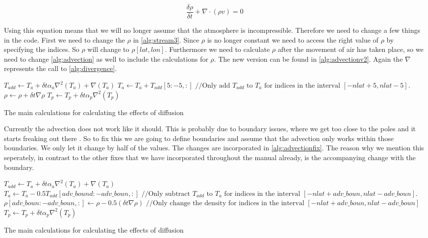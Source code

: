 \begin{equation}
    \frac{\delta \rho}{\delta t} + \nabla \cdot (\rho v) = 0
    \label{eq:mass continuity}
\end{equation}

Using this equation means that we will no longer assume that the atmosphere is incompressible. Therefore we need to change a few things in the code. First we need to change the $\rho$ in 
\autoref{alg:stream3}. Since $\rho$ is no longer constant we need to access the right value of $\rho$ by specifying the indices. So $\rho$ will change to $\rho[lat, lon]$. Furthermore we need
to calculate $\rho$ after the movement of air has taken place, so we need to change \autoref{alg:advection} as well to include the calculations for $\rho$. The new version can be found in 
\autoref{alg:advectionv2}. Again the $\nabla$ represents the call to \autoref{alg:divergence}.


\begin{algorithm}
    $T_{add} \leftarrow T_a + \delta t \alpha_a \nabla^2(T_a) + \nabla(T_a)$ \;
    $T_a \leftarrow T_a + T_{add}[5:-5, :] \text{ //Only add } T_{add} \text{ to } T_a \text{ for indices in the interval } [-nlat + 5, nlat - 5]$. \;
    $\rho \leftarrow \rho + \delta t \nabla \rho$ \;
    $T_p \leftarrow T_p + \delta t \alpha_p \nabla^2(T_p)$ \;
    \caption{The main calculations for calculating the effects of diffusion}
    \label{alg:advectionv2}
\end{algorithm}

Currently the advection does not work like it should. This is probably due to boundary issues, where we get too close to the poles and it starts freaking out there \cite{simon}. So to fix this 
we are going to define boundaries and assume that the advection only works within those boundaries. We only let it change by half of the values. The changes are incorporated in 
\autoref{alg:advectionfix}. The reason why we mention this seperately, in contrast to the other fixes that we have incorporated throughout the manual already, is the accompanying change with the 
boundary. 

\begin{algorithm}
        $T_{add} \leftarrow T_a + \delta t \alpha_a \nabla^2(T_a) + \nabla(T_a)$ \;
        $T_a \leftarrow T_a - 0.5T_{add}[adv\_bound:-adv\_boun, :] \text{ //Only subtract } T_{add} \text{ to } T_a \text{ for indices in the interval } [-nlat + adv\_boun, nlat - adv\_boun]$. \;
        $\rho[adv\_boun: -adv\_boun, :] \leftarrow \rho - 0.5(\delta t \nabla \rho) \text{ //Only change the density for indices in the interval } [-nlat + adv\_boun, nlat - adv\_boun]$ \;
        $T_p \leftarrow T_p + \delta t \alpha_p \nabla^2(T_p)$ \;
    \caption{The main calculations for calculating the effects of diffusion}
    \label{alg:advectionfix}
\end{algorithm}


